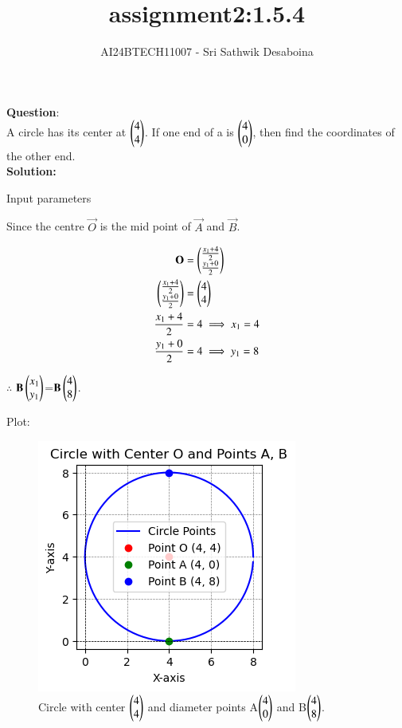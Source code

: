 \documentclass[journal,12pt,onecolumn]{IEEEtran}
\theoremstyle{remark}
\begin{document}

\vspace{3cm}

\title{assignment2:1.5.4}
\author{AI24BTECH11007 - Sri Sathwik Desaboina}
\maketitle
\bigskip

\renewcommand{\thefigure}{\theenumi}
\renewcommand{\thetable}{\theenumi}
\textbf{Question}:\\
A circle has its center at $\begin{pmatrix}4\\4\end{pmatrix}$. If one end of a is $\begin{pmatrix}4\\0\end{pmatrix}$, then find the coordinates of the other end.
\\
\textbf{Solution: }
\begin{table}[h!]    
    \centering
    
    \caption{Input parameters }
    \label{table}
  \end{table}
Since the centre $\vec O$ is the mid point of $\vec A$ and $\vec B$.

\begin{align}
	\mathbf O &= \begin{pmatrix}\frac{x_1+4}{2}\\\frac{y_1+0}{2}\end{pmatrix} \\
	\begin{pmatrix}\frac{x_1 + 4}{2}\\\frac{y_1 + 0}{2}\end{pmatrix} &= \begin{pmatrix}4\\4\end{pmatrix} \\
	\frac{x_1 + 4}{2} &= 4 \implies
	x_1 = 4 \\
	\frac{y_1 + 0}{2} &= 4 \implies
	y_1 = 8
\end{align}

$\therefore$ $\mathbf B\begin{pmatrix}x_1\\y_1\end{pmatrix}$=$\mathbf B\begin{pmatrix}4\\8\end{pmatrix}$.






 Plot:

\begin{figure}[h!]
    \centering
	\includegraphics[scale=1]{figs/circle_plot.png}
	\caption{Circle with center $\begin{pmatrix}4\\4\end{pmatrix}$ and diameter points A$\begin{pmatrix}4\\0\end{pmatrix}$ and B$\begin{pmatrix}4\\8\end{pmatrix}$.}
    \label{fig:circle_plot}
\end{figure}
\end{document}
